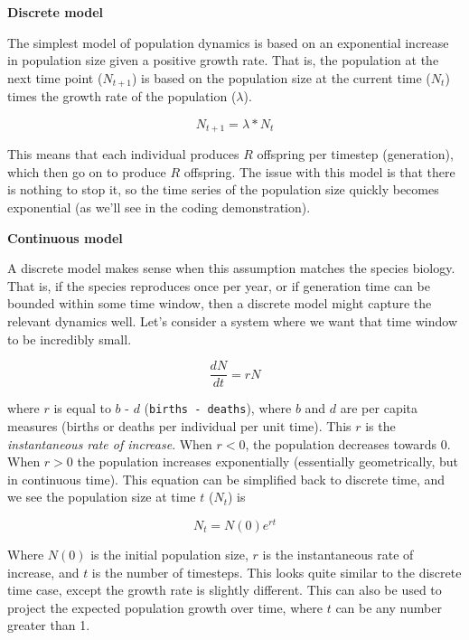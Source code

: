 \documentclass[12pt]{article}
\begin{document}
\noindent \textbf{Discrete model}

The simplest model of population dynamics is based on an exponential increase in population size given a positive growth rate. That is, the population at the next time point ($N_{t+1}$) is based on the population size at the current time ($N_t$) times the growth rate of the population ($\lambda$). 

\begin{equation}
N_{t+1} = \lambda * N_t 
\end{equation}

This means that each individual produces $R$ offspring per timestep (generation), which then go on to produce $R$ offspring. The issue with this model is that there is nothing to stop it, so the time series of the population size quickly becomes exponential (as we'll see in the coding demonstration). 






\bigskip



\textbf{Continuous model}

A discrete model makes sense when this assumption matches the species biology. That is, if the species reproduces once per year, or if generation time can be bounded within some time window, then a discrete model might capture the relevant dynamics well. Let's consider a system where we want that time window to be incredibly small. 

\begin{equation}
\frac{dN}{dt} = rN 
\end{equation}

where $r$ is equal to $b$ - $d$ (\texttt{births - deaths}), where $b$ and $d$ are per capita measures (births or deaths per individual per unit time). This $r$ is the \textit{instantaneous rate of increase}. When $r < 0$, the population decreases towards 0. When $r > 0$ the population increases exponentially (essentially geometrically, but in continuous time). This equation can be simplified back to discrete time, and we see the population size at time $t$ ($N_t$) is

\begin{equation}
N_{t} = N(0)e^{rt}
\end{equation}

Where $N(0)$ is the initial population size, $r$ is the instantaneous rate of increase, and $t$ is the number of timesteps. This looks quite similar to the discrete time case, except the growth rate is slightly different. This can also be used to project the expected population growth over time, where $t$ can be any number greater than 1. 
\end{document}
